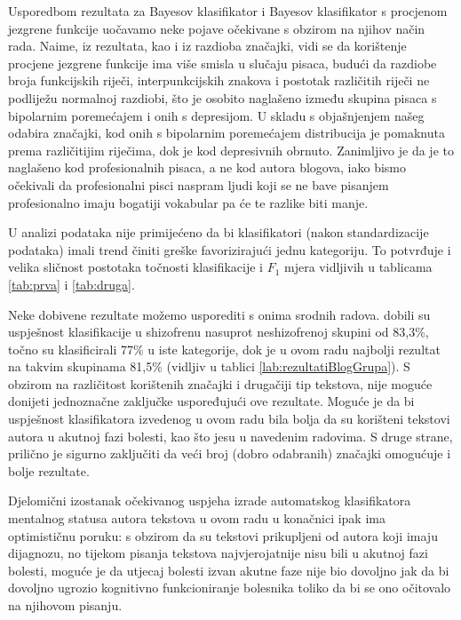 \documentclass[10pt, a4paper]{article}
\begin{document}
Usporedbom rezultata za Bayesov klasifikator i Bayesov klasifikator s procjenom jezgrene funkcije uočavamo neke pojave očekivane s obzirom na njihov način rada. Naime, iz rezultata, kao i iz razdioba značajki, vidi se da korištenje procjene jezgrene funkcije ima više smisla u slučaju pisaca, budući da razdiobe broja funkcijskih riječi, interpunkcijskih znakova i postotak različitih riječi ne podliježu normalnoj razdiobi, što je osobito naglašeno između skupina pisaca s bipolarnim poremećajem i onih s depresijom. U skladu s objašnjenjem našeg odabira značajki, kod onih s bipolarnim poremećajem distribucija je pomaknuta prema različitijim riječima, dok je kod depresivnih obrnuto. Zanimljivo je da je to naglašeno kod profesionalnih pisaca, a ne kod autora blogova, iako bismo očekivali da profesionalni pisci naspram ljudi koji se ne bave pisanjem profesionalno imaju bogatiji vokabular pa će te razlike biti manje.

U analizi podataka nije primijećeno da bi klasifikatori (nakon standardizacije podataka) imali trend činiti greške favorizirajući jednu kategoriju. To potvrđuje i velika sličnost postotaka točnosti klasifikacije i  $F_1$ mjera vidljivih u tablicama \ref{tab:prva} i \ref{tab:druga}.

Neke dobivene rezultate možemo usporediti s onima srodnih radova.  \citet{strous-2009} dobili su uspješnost klasifikacije u shizofrenu nasuprot neshizofrenoj skupini od 83,3\%, \citet{exray} točno su klasificirali 77\% u iste kategorije, dok je u ovom radu najbolji rezultat na takvim skupinama 81,5\% (vidljiv u tablici \ref{lab:rezultatiBlogGrupa}). S obzirom na različitost korištenih značajki i drugačiji tip tekstova, nije moguće donijeti jednoznačne zaključke uspoređujući ove rezultate. Moguće je da bi uspješnost klasifikatora izvedenog u ovom radu bila bolja da su korišteni tekstovi autora u akutnoj fazi bolesti, kao što jesu u navedenim radovima. S druge strane, prilično je sigurno zaključiti da veći broj (dobro odabranih) značajki omogućuje i bolje rezultate.

Djelomični izostanak očekivanog uspjeha izrade automatskog klasifikatora mentalnog statusa autora tekstova u ovom radu u konačnici ipak ima optimističnu poruku: s obzirom da su tekstovi prikupljeni  od autora koji imaju dijagnozu, no tijekom pisanja tekstova najvjerojatnije nisu bili u akutnoj fazi bolesti, moguće je da utjecaj bolesti izvan akutne faze nije bio dovoljno jak da bi dovoljno ugrozio kognitivno funkcioniranje bolesnika toliko da bi se ono očitovalo na njihovom pisanju. 
\end{document}
